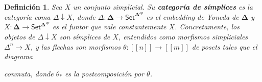 \documentclass[11pt]{report}
\theoremstyle{colored}
\newtheorem{definition}{Definición}[section]
\newcommand{\nat}[1]{[\![#1]\!]}
\newcommand{\ord}[1]{\nat{#1}}
\newcommand{\cat}[1]{\mathsf{#1}}
\renewcommand{\ss}[1]{\Delta^{#1}}
\newcommand{\ordcat}{\boldsymbol{\Delta}}
\begin{document}
\begin{definition} Sea $X$ un conjunto simplicial. Su \textbf{categoría de símplices} es la categoría coma $\Delta \downarrow X$, donde $\Delta: \ordcat \to \cat{Set}^{\ordcat^{op}}$ es el embedding de Yoneda de $\ordcat$ y $X : \ordcat \to \cat{Set}^{\ordcat^{op}}$ es el funtor que vale constantemente $X$. Concretamente, los objetos de $\Delta \downarrow X$ son \textit{símplices} de $X$, entendidos como morfismos simpliciales $\ss{n} \to X$, y las flechas son morfismos $\theta : \ord{n} \to \ord{m}$ de posets tales que el diagrama
\begin{center}
\end{center}
conmuta, donde $\theta_*$ es la postcomposición por $\theta$.
\end{definition}
\end{document}
